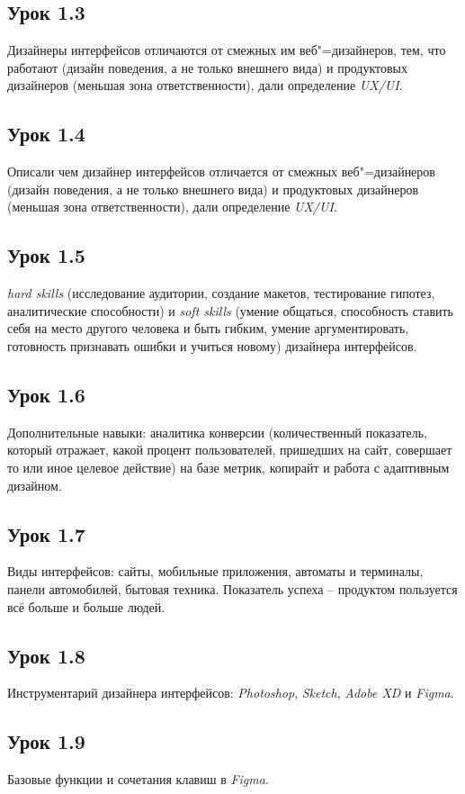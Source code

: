 \documentclass[variant=practice]{bsuir}
\begin{document}
\subsection{Урок 1.3} Дизайнеры интерфейсов отличаются от смежных им
веб"=дизайнеров, тем, что работают (дизайн поведения, а не только внешнего вида)
и продуктовых дизайнеров (меньшая зона ответственности), дали определение
\textit{UX/UI}.

\subsection{Урок 1.4} Описали чем дизайнер интерфейсов отличается от смежных
веб"=дизайнеров (дизайн поведения, а не только внешнего вида) и продуктовых
дизайнеров (меньшая зона ответственности), дали определение \textit{UX/UI}.

\subsection{Урок 1.5} \textit{hard skills} (исследование аудитории, создание
макетов, тестирование гипотез, аналитические способности) и \textit{soft skills}
(умение общаться, способность ставить себя на место другого человека и быть
гибким, умение аргументировать, готовность признавать ошибки и учиться новому)
дизайнера интерфейсов.

\subsection{Урок 1.6} Дополнительные навыки: аналитика конверсии (количественный
показатель, который отражает, какой процент пользователей, пришедших на сайт,
совершает то или иное целевое действие) на базе метрик, копирайт и работа с
адаптивным дизайном.

\subsection{Урок 1.7} Виды интерфейсов: сайты, мобильные приложения, автоматы и
терминалы, панели автомобилей, бытовая техника. Показатель успеха -- продуктом
пользуется всё больше и больше людей.

\subsection{Урок 1.8} Инструментарий дизайнера интерфейсов: \textit{Photoshop},
\textit{Sketch}, \textit{Adobe XD} и \textit{Figma}.

\subsection{Урок 1.9} Базовые функции и сочетания клавиш в \textit{Figma}.
\end{document}
